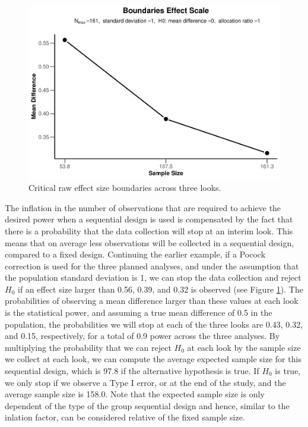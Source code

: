 \documentclass[
  english,
  ,jou, a4paper,floatsintext]{apa6}
\begin{document}
\begin{figure}
\centering
\includegraphics{sequential_tutorial_files/figure-latex/power-bounds-1.pdf}
\caption{\label{fig:power-bounds}Critical raw effect size boundaries across three looks.}
\end{figure}

The inflation in the number of observations that are required to achieve the desired power when a sequential design is used is compensated by the fact that there is a probability that the data collection will stop at an interim look. This means that on average less observations will be collected in a sequential design, compared to a fixed design. Continuing the earlier example, if a Pocock correction is used for the three planned analyses, and under the assumption that the population standard deviation is 1, we can stop the data collection and reject \(H_0\) if an effect size larger than 0.56, 0.39, and 0.32 is observed (see Figure \ref{fig:power-bounds}). The probabilities of observing a mean difference larger than these values at each look is the statistical power, and assuming a true mean difference of 0.5 in the population, the probabilities we will stop at each of the three looks are 0.43, 0.32, and 0.15, respectively, for a total of 0.9 power across the three analyses. By multiplying the probability that we can reject \(H_0\) at each look by the sample size we collect at each look, we can compute the average expected sample size for this sequential design, which is 97.8 if the alternative hypothesis is true. If \(H_0\) is true, we only stop if we observe a Type I error, or at the end of the study, and the average sample size is 158.0. Note that the expected sample size is only dependent of the type of the group sequential design and hence, similar to the inlation factor, can be considered relative of the fixed sample size.
\end{document}
